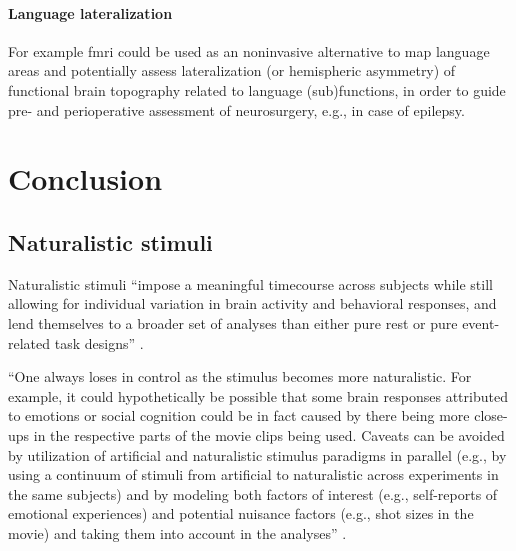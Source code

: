 \paragraph{Language lateralization}



%
For example \ac{fmri} could be used as an noninvasive alternative to map
language areas and potentially assess lateralization (or hemispheric asymmetry)
of functional brain topography related to language (sub)functions, in order to
guide pre- and perioperative assessment of neurosurgery, e.g., in case of
epilepsy.


\section{Conclusion}

\subsection{Naturalistic stimuli}


%
Naturalistic stimuli ``impose a meaningful timecourse across subjects while
still allowing for individual variation in brain activity and behavioral
responses, and lend themselves to a broader set of analyses than either pure
rest or pure event-related task designs'' \citep[][p. 142]{finn2017can}.

%
``One always loses in control as the stimulus becomes more naturalistic.
%
For example, it could hypothetically be possible that some brain responses
attributed to emotions or social cognition could be in fact caused by there
being more close-ups in the respective parts of the movie clips being used.
%
Caveats can be avoided by utilization of artificial and naturalistic stimulus
paradigms in parallel (e.g., by using a continuum of stimuli from artificial to
naturalistic across experiments in the same subjects) and by modeling both
factors of interest (e.g., self-reports of emotional experiences) and potential
nuisance factors (e.g., shot sizes in the movie) and taking them into account in
the analyses'' \citep{jaaskelainen2021movies}.

